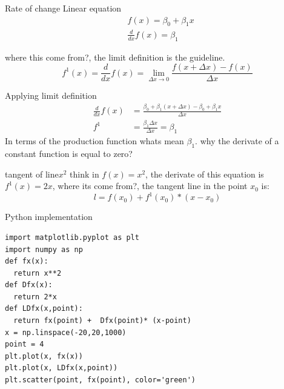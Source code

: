 \documentclass{beamer}
\begin{document}
\begin{frame}{Rate of change }{Linear equation}
\begin{equation}
\begin{align*}
&f(x) = \beta_{0} + \beta_{1} x \\
&\frac{d}{dx}f(x) = \beta_{1}
\end{align*}
\end{equation}

where this come from?, the limit definition is the guideline.
\begin{equation}
f^{1}(x) = \frac{d}{dx}f(x) = \mathop {\lim }\limits_{\Delta x \to 0} \frac{f(x + \Delta x) - f(x)}{\Delta x}
\end{equation}
\end{frame}

\begin{frame}{Applying limit definition}
\begin{equation}
\begin{align*}
\frac{d}{dx}f(x) &= \frac{\beta_{0} + \beta_{1}(x + \Delta x) - \beta_{0} + \beta_{1}x}{\Delta x} \\
f^{1} & = \frac{\beta_{1}\Delta x}{\Delta x} = \beta_{1}
\end{align*}
\end{equation}
In terms of the production function whats mean $\beta_{1}$.
why the derivate of a constant function is equal to zero?
\end{frame}




\begin{frame}[fragile]{tangent of line}{$x^2$}
think in $f(x) = x^{2}$, the derivate of this equation is $f^{1}(x) = 2x$, where its come from?, the tangent line in the point $x_{0}$ is:
\begin{equation}
l = f(x_{0}) + f^{1}(x_{0}) * (x - x_{0})
\end{equation}
\end{frame}




\begin{frame}[fragile]{Python implementation}
\begin{lstlisting}
import matplotlib.pyplot as plt
import numpy as np
def fx(x):
  return x**2
def Dfx(x):
  return 2*x 
def LDfx(x,point):
  return fx(point) +  Dfx(point)* (x-point)
x = np.linspace(-20,20,1000)
point = 4
plt.plot(x, fx(x))
plt.plot(x, LDfx(x,point))
plt.scatter(point, fx(point), color='green')
\end{lstlisting}
\end{frame}
\end{document}

